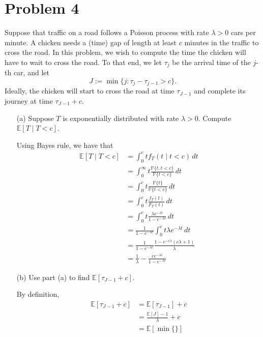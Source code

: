 \documentclass[11pt]{article}
\newcommand{\bbE}{\mathbb{E}}
\newcommand{\bbP}{\mathbb{P}}
\begin{document}
\newpage
\section*{Problem 4}
\begin{problem}
    Suppose that traffic on a road follows a Poisson process with rate \(\lambda > 0\) cars per minute. A chicken needs a (time) gap of length at least \(c\) minutes in the traffic to cross the road. In this problem, we wish to compute the time the chicken will have to wait to cross the road. To that end, we let \(\tau_j\) be the arrival time of the \(j\)-th car, and let 
\[
J := \min \{ j : \tau_j - \tau_{j-1} > c \}.
\]
Ideally, the chicken will start to cross the road at time \(\tau_{J-1}\) and complete its journey at time \(\tau_{J-1} + c\).

\begin{enumerate}
    \item[(a)] Suppose \(T\) is exponentially distributed with rate \(\lambda > 0\). Compute \(\mathbb{E}[T \mid T < c]\).
    \begin{solution}
        Using Bayes rule, we have that 
        \begin{align*}
            \bbE[T \mid T< c] &= \int_0^c t f_{T}(t \mid t< c)\, dt\\
             &=\int_0^\infty t \frac{\bbP\{t ,t< c\}}{\bbP\{t< c\}}\, dt\\
             &= \int_0^c t\frac{\bbP\{t\}}{\bbP\{t < c\}}\,dt\\
             &= \int_0^c t \frac{f_T(t)}{F_T(t)}\, dt\\
             &= \int_0^c t \frac{\lambda e^{-\lambda t}}{1- e^{-\lambda c}}\, dt\\
             &= \frac{1}{1- e^{-\lambda c}}\int_0^c t\lambda e^{-\lambda t}\, dt\\
             &= \frac{1}{1- e^{-\lambda c}} \frac{1 - e^{-c\lambda}(c\lambda + 1)}{\lambda}\\
             &= \frac{1}{\lambda} - \frac{ce^{-\lambda c}}{1- e^{-\lambda c}}
        \end{align*}
    \end{solution}
    \item[(b)] Use part (a) to find \(\mathbb{E}[\tau_{J-1} + c]\).
\begin{solution}
    By definition, 
    \begin{align*}
        \bbE[\tau_{J-1} + c] &= \bbE[\tau_{J-1}] + c\\
        &= \frac{\bbE[J] - 1}{\lambda} + c\\
        &= \bbE[\min\{\}]
    \end{align*}
\end{solution}
\end{enumerate}

\end{problem}
\end{document}
